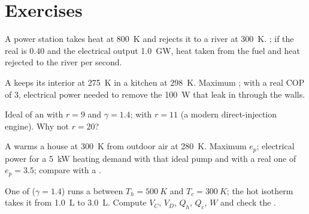 \section{Exercises}

\begin{exercise}[$\star$]\label{exo:b1:heat-engines:1}
A power station takes heat at \qty{800}{K} and rejects it to a river at
\qty{300}{K}. ; if the real  is $0.40$ and the
electrical output \qty{1.0}{GW}, heat taken from the fuel and heat
rejected to the river per second.
\end{exercise}

\begin{exercise}[$\star$]\label{exo:b1:heat-engines:2}
A  keeps its interior at \qty{275}{K} in a kitchen at
\qty{298}{K}. Maximum ; with a real COP of $3$,
electrical power needed to remove the \qty{100}{W} that leak in through
the walls.
\end{exercise}

\begin{exercise}[$\star$]\label{exo:b1:heat-engines:3}
Ideal  of an  with $r = 9$ and $\gamma = 1.4$; with
$r = 11$ (a modern direct-injection engine). Why not $r = 20$?
\end{exercise}

\begin{exercise}[$\star$]\label{exo:b1:heat-engines:4}
A  warms a house at \qty{300}{K} from outdoor air at \qty{280}{K}.
Maximum $e_p$; electrical power for a \qty{5}{kW} heating demand with
that ideal pump and with a real one of $e_p = 3.5$; compare with a
.
\end{exercise}

\begin{exercise}[$\star\star$]\label{exo:b1:heat-engines:5}
One  of  ($\gamma = 1.4$) runs a  between
$T_h = \qty{500}{K}$ and $T_c = \qty{300}{K}$; the hot isotherm takes it from
\qty{1.0}{L} to \qty{3.0}{L}. Compute $V_C$, $V_D$, $Q_h$, $Q_c$, $W$ and
check the .
\end{exercise}

